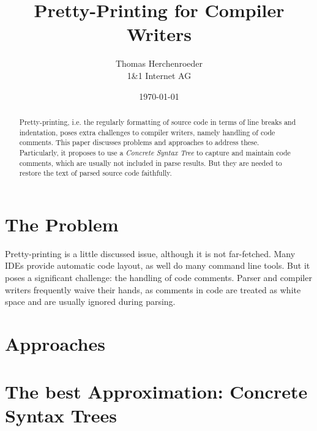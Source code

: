 \documentclass[11pt,a4paper]{article}
\begin{document}
\title{Pretty-Printing for Compiler Writers}
\author{
Thomas Herchenroeder\\
1\&1 Internet AG
}

\date{\today}
\maketitle

\begin{abstract} 
Pretty-printing, i.e. the regularly formatting of source code
in terms of line breaks and indentation, poses extra challenges to compiler
writers, namely handling of code comments. This paper discusses problems and
approaches to address these. Particularly, it proposes to use a \emph{Concrete
Syntax Tree} to capture and maintain code comments, which are usually not
included in parse results. But they are needed to restore the text of parsed
source code faithfully.
\end{abstract}

\section{The Problem}
Pretty-printing is a little discussed issue, although it is not
far-fetched. Many IDEs provide automatic code layout, as well do many command
line tools. But it poses a significant
challenge: the handling of code comments. Parser and compiler writers
frequently waive their hands, as comments in code are treated as white space and
are usually ignored during parsing.

\section{Approaches}

\section{The best Approximation: Concrete Syntax Trees}


\end{document}
